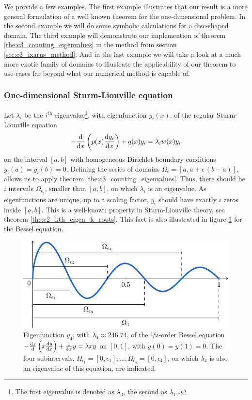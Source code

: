 We provide a few examples. The first example illustrates that our result is a more general formulation of a well known theorem for the one-dimensional problem. In the second example we will do some symbolic calculations for a disc-shaped domain. The third example will demonstrate our implemention of theorem \ref{the:c3_counting_eigenvalues} in the method from section \ref{sec:c3_ixarus_method}. And in the last example we will take a look at a much more exotic family of domains to illustrate the applicability of our theorem to use-cases far beyond what our numerical method is capable of.

\subsubsection{One-dimensional Sturm-Liouville equation}

Let $\lambda_i$ be the $i^{\text{th}}$ eigenvalue\footnote{The first eigenvalue is denoted as $\lambda_0$, the second as $\lambda_1$\dots}, with eigenfunction $y_i(x)$, of the regular Sturm-Liouville equation
$$
  -\dv{x} \left( p(x) \dv{y_i}{x} \right) + q(x) y_i = \lambda_i w(x) y_i
$$
on the interval $[a, b]$ with homogeneous Dirichlet boundary conditions $y_i(a) = y_i(b) = 0$. Defining the series of domains $\Omega_\epsilon = [a, a + \epsilon\,(b-a)]$, allows us to apply theorem \ref{the:c3_counting_eigenvalues}. Thus, there should be $i$ intervals $\Omega_{\epsilon_j}$, smaller than $[a, b]$, on which $\lambda_i$ is an eigenvalue. As eigenfunctions are unique, up to a scaling factor, $y_i$ should have exactly $i$ zeros inside $[a, b]$. This is a well-known property in Sturm-Liouville theory, see theorem \ref{the:c2_kth_eigen_k_roots}. This fact is also illustrated in figure \ref{fig:c3_counting_sturm_liouville} for the Bessel equation.

\begin{figure}
  \begin{center}
    \includegraphics[width=.9\textwidth]{img/chapter3/counting/sturm-liouville.pdf}
    \caption{Eigenfunction $y_4$, with $\lambda_4 \approx 246.74$, of the $\nicefrac{1}{2}$-order Bessel equation \cite{titchmarsh_eigenfunction_1962} $-\dv{x}{} \left( x \dv{y}{x} \right) + \frac{1}{4x} y = \lambda x y $ on $[0, 1]$, with $y(0) = y(1) = 0$. The four subintervals, $\Omega_{\epsilon_1} = [0, \epsilon_1],\dots, \Omega_{\epsilon_4} = [0, \epsilon_4]$, on which $\lambda_4$ is also an eigenvalue of this equation, are indicated.}\label{fig:c3_counting_sturm_liouville}
  \end{center}
\end{figure}

